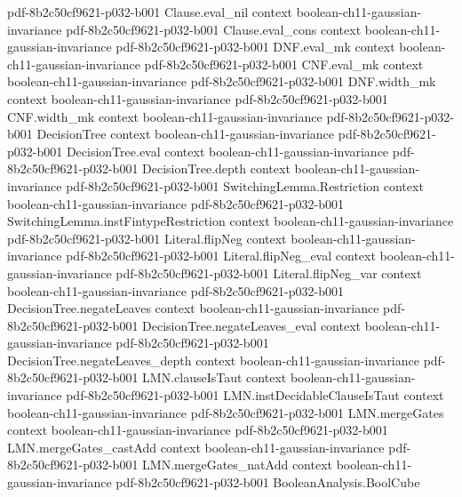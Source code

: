 \begin{theorem}
  {pdf-8b2c50cf9621-p032-b001}
\proofstep
  {Clause.eval_nil}
  {context}
  {boolean-ch11-gaussian-invariance}
  {pdf-8b2c50cf9621-p032-b001}
\proofstep
  {Clause.eval_cons}
  {context}
  {boolean-ch11-gaussian-invariance}
  {pdf-8b2c50cf9621-p032-b001}
\proofstep
  {DNF.eval_mk}
  {context}
  {boolean-ch11-gaussian-invariance}
  {pdf-8b2c50cf9621-p032-b001}
\proofstep
  {CNF.eval_mk}
  {context}
  {boolean-ch11-gaussian-invariance}
  {pdf-8b2c50cf9621-p032-b001}
\proofstep
  {DNF.width_mk}
  {context}
  {boolean-ch11-gaussian-invariance}
  {pdf-8b2c50cf9621-p032-b001}
\proofstep
  {CNF.width_mk}
  {context}
  {boolean-ch11-gaussian-invariance}
  {pdf-8b2c50cf9621-p032-b001}
\proofstep
  {DecisionTree}
  {context}
  {boolean-ch11-gaussian-invariance}
  {pdf-8b2c50cf9621-p032-b001}
\proofstep
  {DecisionTree.eval}
  {context}
  {boolean-ch11-gaussian-invariance}
  {pdf-8b2c50cf9621-p032-b001}
\proofstep
  {DecisionTree.depth}
  {context}
  {boolean-ch11-gaussian-invariance}
  {pdf-8b2c50cf9621-p032-b001}
\proofstep
  {SwitchingLemma.Restriction}
  {context}
  {boolean-ch11-gaussian-invariance}
  {pdf-8b2c50cf9621-p032-b001}
\proofstep
  {SwitchingLemma.instFintypeRestriction}
  {context}
  {boolean-ch11-gaussian-invariance}
  {pdf-8b2c50cf9621-p032-b001}
\proofstep
  {Literal.flipNeg}
  {context}
  {boolean-ch11-gaussian-invariance}
  {pdf-8b2c50cf9621-p032-b001}
\proofstep
  {Literal.flipNeg_eval}
  {context}
  {boolean-ch11-gaussian-invariance}
  {pdf-8b2c50cf9621-p032-b001}
\proofstep
  {Literal.flipNeg_var}
  {context}
  {boolean-ch11-gaussian-invariance}
  {pdf-8b2c50cf9621-p032-b001}
\proofstep
  {DecisionTree.negateLeaves}
  {context}
  {boolean-ch11-gaussian-invariance}
  {pdf-8b2c50cf9621-p032-b001}
\proofstep
  {DecisionTree.negateLeaves_eval}
  {context}
  {boolean-ch11-gaussian-invariance}
  {pdf-8b2c50cf9621-p032-b001}
\proofstep
  {DecisionTree.negateLeaves_depth}
  {context}
  {boolean-ch11-gaussian-invariance}
  {pdf-8b2c50cf9621-p032-b001}
\proofstep
  {LMN.clauseIsTaut}
  {context}
  {boolean-ch11-gaussian-invariance}
  {pdf-8b2c50cf9621-p032-b001}
\proofstep
  {LMN.instDecidableClauseIsTaut}
  {context}
  {boolean-ch11-gaussian-invariance}
  {pdf-8b2c50cf9621-p032-b001}
\proofstep
  {LMN.mergeGates}
  {context}
  {boolean-ch11-gaussian-invariance}
  {pdf-8b2c50cf9621-p032-b001}
\proofstep
  {LMN.mergeGates_castAdd}
  {context}
  {boolean-ch11-gaussian-invariance}
  {pdf-8b2c50cf9621-p032-b001}
\proofstep
  {LMN.mergeGates_natAdd}
  {context}
  {boolean-ch11-gaussian-invariance}
  {pdf-8b2c50cf9621-p032-b001}
\proofstep
  {BooleanAnalysis.BoolCube}

\end{theorem}
